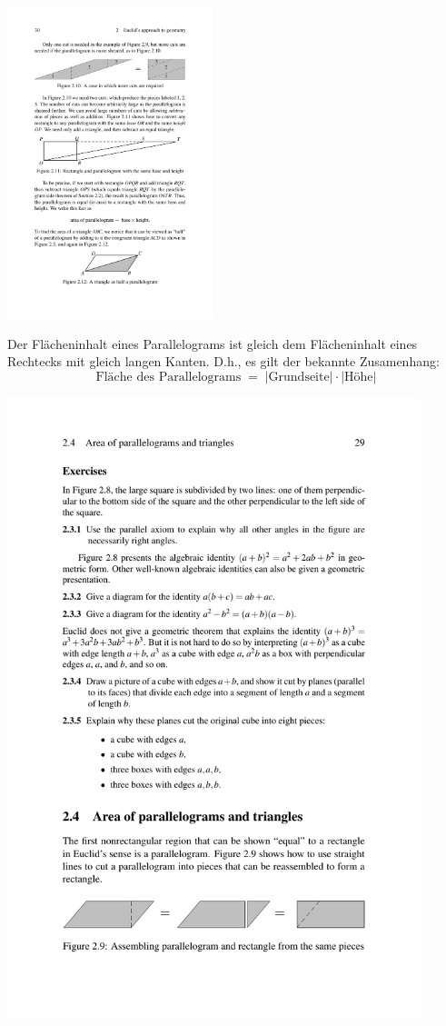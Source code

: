 \centerline{\includegraphics[width=6cm]{BILDER/BildFlaecheDreieck.pdf}}


Der Flächeninhalt eines Parallelograms ist gleich dem Flächeninhalt
eines Rechtecks mit gleich langen Kanten. D.h.,
es gilt der bekannte Zusamenhang: 
$$
\mbox{Fläche des Parallelograms} \; = \; |\mbox{Grundseite}| \cdot |\mbox{Höhe}|
$$



\bigskip

\centerline{\includegraphics[width=12cm]{BILDER/BildFlaecheParallelogramm.pdf}}

